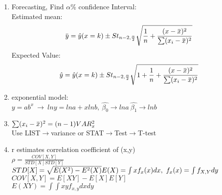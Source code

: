 \documentclass[10pt]{article}
\newcommand{\overbar}[1]{\mkern 1.5mu\overline{\mkern-1.5mu#1\mkern-1.5mu}\mkern 1.5mu}
\begin{document}
\begin{multicols}{2}
\begin{enumerate}
\begin{enumerate}
\item Forecasting, Find $\alpha$\% confidence Interval:\\
	Estimated mean:
	$$\overbar{y} = \hat{y}(x = k)\pm S t_{n-2,\frac{\alpha}{2}}  \sqrt{\frac{1}{n} + \frac{(x-\overbar{x})^2}{\sum(x_i-\overbar{x})^2}}$$
	Expected Value:
	$$\hat{y} = \hat{y}(x = k)\pm S t_{n-2,\frac{\alpha}{2}} \sqrt{1 + \frac{1}{n} + \frac{(x-\overbar{x})^2}{\sum(x_i-\overbar{x})^2}}$$
\item exponential model:\\
	$y = ab^x \ \rightarrow \ lny = lna + xlnb, \ \hat{\beta_0}\rightarrow lna \ \hat{\beta_1}\rightarrow lnb$

\item $\sum(x_i-\overbar{x})^2 = (n-1)VAR_x^2$\\
Use LIST$\rightarrow$variance or STAT$\rightarrow$Test$\rightarrow$T-test

\item r estimates correlation coefficient of (x,y)\\
	$\rho = \frac{COV[X,Y]}{STD[X]STD[Y]}$\\
	$STD[X] = \sqrt{E(X^2) - E^2(X)}\\E(X) = \int xf_x(x)dx, \ f_x(x) = \int f_{X,Y}dy$\\
	$COV[X,Y] = E[XY] - E[X]E[Y]$\\
	$E(XY) = \int \int xyf_{x,y}dxdy$
\end{enumerate}


\end{enumerate}
\end{multicols}
\end{document}
